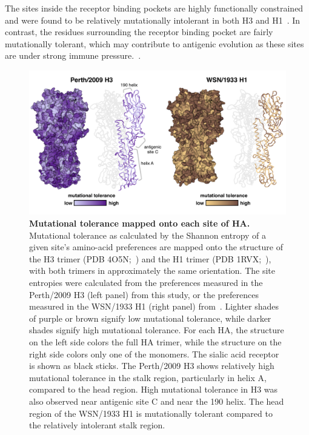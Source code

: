 \documentclass[9pt,twocolumn,twoside]{pnas-new}
\begin{document}
The sites inside the receptor binding pockets are highly functionally constrained and were found to be relatively mutationally intolerant in both H3 and H1~\citep{wilson1981structure}.
In contrast, the residues surrounding the receptor binding pocket are fairly mutationally tolerant, which may contribute to antigenic evolution as these sites are under strong immune pressure.~\citep{wiley1981structural}.

\begin{figure}
\centering
\includegraphics[width=11.4cm]{figs/mut_tolerance/entropy_heatmap.pdf}
\caption{\label{fig:mut_tolerance}
{\bf Mutational tolerance mapped onto each site of HA.}
Mutational tolerance as calculated by the Shannon entropy of a given site's amino-acid preferences are mapped onto the structure of the H3 trimer (PDB 4O5N;~\cite{lee2014receptor}) and the H1 trimer (PDB 1RVX;~\cite{gamblin2004structure}), with both trimers in approximately the same orientation. 
The site entropies were calculated from the preferences measured in the Perth/2009 H3 (left panel) from this study, or the preferences measured in the WSN/1933 H1 (right panel) from~\cite{doud2016accurate}. 
Lighter shades of purple or brown signify low mutational tolerance, while darker shades signify high mutational tolerance. 
For each HA, the structure on the left side colors the full HA trimer, while the structure on the right side colors only one of the monomers.
The sialic acid receptor is shown as black sticks.
The Perth/2009 H3 shows relatively high mutational tolerance in the stalk region, particularly in helix A, compared to the head region. 
High mutational tolerance in H3 was also observed near antigenic site C and near the 190 helix.
The head region of the WSN/1933 H1 is mutationally tolerant compared to the relatively intolerant stalk region. 
}
\end{figure}
\end{document}
